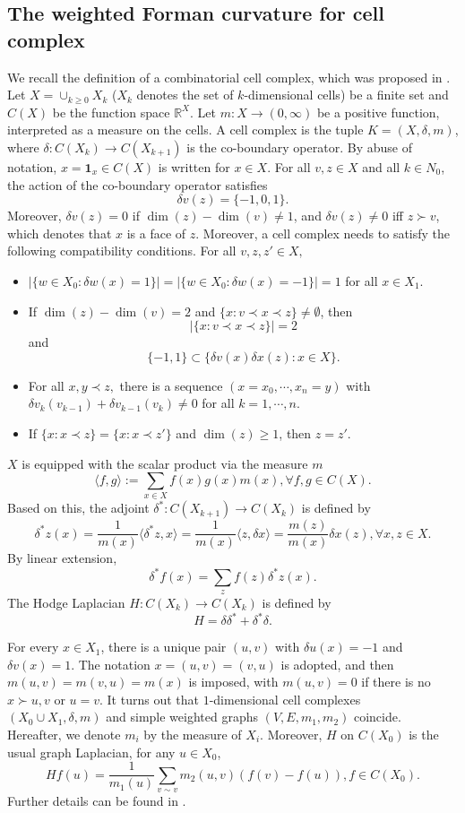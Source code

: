 \documentclass{article}
\begin{document}
\subsection{The weighted Forman curvature for  cell complex}\label{weightform}
We  recall the definition of a combinatorial cell complex, which was proposed in \cite{F03,JM21}. Let $X=\cup_{k\geq 0}X_k$ ($X_k$ denotes the set of $k$-dimensional cells) be a finite set and $C(X)$ be the function space $\mathbb{R}^X$. 
Let $m:X\rightarrow (0,\infty)$ be a positive function, interpreted as a measure on the cells. A  cell complex is the tuple $K=(X,\delta,m)$, where $\delta:C(X_k)\rightarrow C(X_{k+1})$ is the co-boundary operator. By abuse of notation, $x = \mathbf{1}_x \in C(X)$ is written for $x \in X$.  For all $v, z \in X$ and all $k \in N_0$, the action of the co-boundary operator satisfies
\[\delta v(z)=\{-1,0,1\}.\]
Moreover, $\delta v(z)=0$ if $\dim(z)-\dim(v)\neq1$, and $\delta v(z)\neq0$ iff $z\succ v$, which denotes that \( x \) is a  face of \( z \).
Moreover,  a cell complex needs to satisfy the following compatibility conditions. For all $v, z, z' \in X,$
\begin{itemize}
    \item $|\{w\in X_0:\delta w(x)=1\}|=|\{w\in X_0: \delta w(x)=-1\}|=1$ for all $x\in X_1$.
    \item If $\dim(z)-\dim(v)=2$ and $\{x:v\prec x\prec z\}\neq \emptyset$, then
    \[|\{x:v\prec x\prec z\}|=2\]
    and 
    \[\{-1,1\}\subset\{\delta v(x)\delta x(z):x\in X\}. \]
    \item For all $x,y\prec z, $ there is a sequence $(x=x_0,\cdots,x_n=y)$ with $\delta v_k(v_{k-1})+\delta v_{k-1}(v_k)\neq 0$ for all $k=1,\cdots,n$.
    \item If $\{x:x\prec z\}=\{x:x\prec z'\}$ and $\dim(z)\geq 1$, then $z=z'.$
\end{itemize}
$X$ is equipped with the scalar product via the measure $m$ 
\[\langle f,g\rangle:=\sum_{x\in X}f(x)g(x)m(x), \forall f,g\in C(X).\]
Based on this, the adjoint $\delta^*:C(X_{k+1})\rightarrow C(X_k)$ is defined by
\[\delta^*z(x)=\frac{1}{m(x)}\langle\delta^*z,x\rangle=\frac{1}{m(x)}\langle z,\delta x\rangle=\frac{m(z)}{m(x)}\delta x(z), \forall x,z\in X.\]
By linear extension,
\[\delta^*f(x)=\sum_zf(z)\delta^*z(x).\]
The  Hodge Laplacian $H : C(X_k) \rightarrow C(X_k)$ is defined by
\[H=\delta \delta^*+\delta^*\delta.\]


For every \( x \in X_1 \), there is a unique pair \( (u, v) \) with \( \delta u(x) = -1 \) and \( \delta v(x) = 1 \). The notation \( x = (u, v) = (v, u) \) is adopted, and then \( m(u,v) = m(v,u) = m(x) \) is imposed, with \( m(u,v) = 0 \) if there is no \( x \succ u, v \) or \( u = v \). It turns out that $1$-dimensional cell complexes $(X_0\cup X_1,\delta, m)$ and simple weighted graphs $(V,E,m_1,m_2)$ coincide. Hereafter, we denote $m_i$ by the measure of $X_i$.  Moreover, \( H \) on \( C(X_0) \) is the usual graph Laplacian, for any $u\in X_0$,
\[H f(u)=\frac{1}{m_1(u)}\sum_{v\sim v}m_2(u,v)(f(v)-f(u)), f\in C(X_0).\]
Further details can be found in \cite{JM21}.
\end{document}
